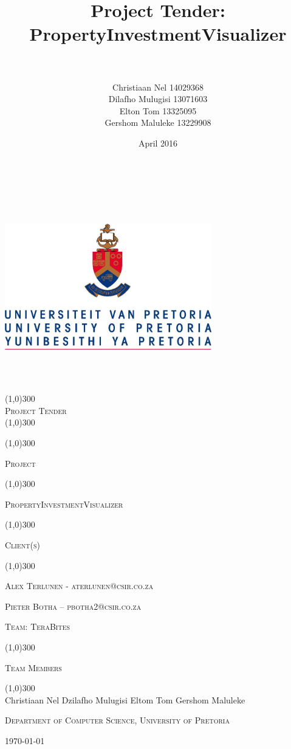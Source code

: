 \documentclass[12pt,a4paper]{report}
\title{Project Tender: \\ PropertyInvestmentVisualizer }
\author{\\\\Christiaan Nel 14029368\\ Dilafho Mulugisi 13071603 \\
	Elton Tom 13325095 \\ Gershom Maluleke 13229908
    }
\date{April 2016}
\begin{document}
\begin{titlepage}
	\begin{center}
		\vspace*{-3cm}\includegraphics[width=9cm,height=9cm,keepaspectratio]{UP.jpg}  \\
		[0.05cm]
		\line(1,0){300} \\
		[0.4cm]
		\textsc{\huge
			Project Tender
		} \\
		[0.1cm]
		\line(1,0){300} \\
		[0.05cm]

	\end{center}
	\centering
	\vspace{0.007cm}
	\line(1,0){300}
	\\[0.05cm]
    {\scshape\LARGE Project \par}
    \line(1,0){300}
	\\[0.2cm]
    {\scshape\large  PropertyInvestmentVisualizer \par}
	\vspace{0.1cm}
	\line(1,0){300}
	\\[0.05cm]
	{\scshape\LARGE Client(s) \par}
	\line(1,0){300}
	\\[0.2cm]
	\vspace{0.01cm}
	
	{\scshape\large Alex Terlunen - aterlunen@csir.co.za\par}
	{\scshape\large Pieter Botha – pbotha2@csir.co.za \par}
	\vspace{0.5cm}
	{\scshape\LARGE Team: \large TeraBites\par}
	\line(1,0){300}
	\\[0.01cm]
	{\scshape\LARGE Team Members\par}
	\line(1,0){300}
	\\[0.01cm]
	\vspace{0.9cm}
	\vfill Christiaan Nel
	\vfill Dzilafho Mulugisi
	\vfill Eltom Tom
	\vfill Gershom Maluleke
	
	\vspace{0.9cm}
    {\scshape\large Department of Computer Science, University of Pretoria\par}


	

	{\large \today\par}
	\end{titlepage}
	
\end{document}
